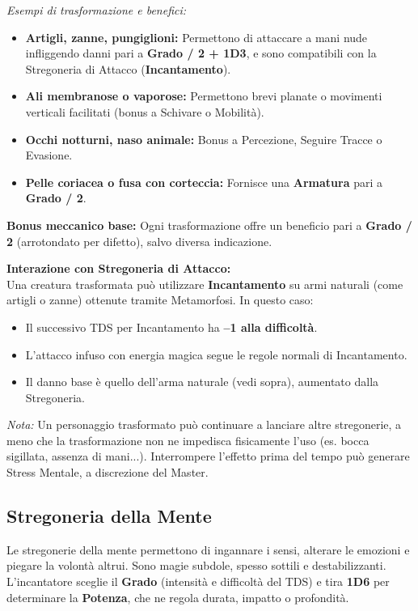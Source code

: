 \documentclass[./magie.tex]{subfiles}
\begin{document}
\textit{Esempi di trasformazione e benefici:}
\begin{itemize}
\item \textbf{Artigli, zanne, pungiglioni:} Permettono di attaccare a mani nude infliggendo danni pari a \textbf{Grado / 2 + 1D3}, e sono compatibili con la Stregoneria di Attacco (\textbf{Incantamento}).
\item \textbf{Ali membranose o vaporose:} Permettono brevi planate o movimenti verticali facilitati (bonus a Schivare o Mobilità).
\item \textbf{Occhi notturni, naso animale:} Bonus a Percezione, Seguire Tracce o Evasione.
\item \textbf{Pelle coriacea o fusa con corteccia:} Fornisce una \textbf{Armatura} pari a \textbf{Grado / 2}.
\end{itemize}

\textbf{Bonus meccanico base:} Ogni trasformazione offre un beneficio pari a \textbf{Grado / 2} (arrotondato per difetto), salvo diversa indicazione.

\vspace{0.5cm}
\textbf{Interazione con Stregoneria di Attacco:} \\
Una creatura trasformata può utilizzare \textbf{Incantamento} su armi naturali (come artigli o zanne) ottenute tramite Metamorfosi. In questo caso:
\begin{itemize}
\item Il successivo TDS per Incantamento ha \textbf{–1 alla difficoltà}.
\item L’attacco infuso con energia magica segue le regole normali di Incantamento.
\item Il danno base è quello dell’arma naturale (vedi sopra), aumentato dalla Stregoneria.
\end{itemize}

\textit{Nota:} Un personaggio trasformato può continuare a lanciare altre stregonerie, a meno che la trasformazione non ne impedisca fisicamente l’uso (es. bocca sigillata, assenza di mani...). Interrompere l’effetto prima del tempo può generare Stress Mentale, a discrezione del Master.


\clearpage
\vspace{0.2cm}
\subsection{Stregoneria della Mente}

Le stregonerie della mente permettono di ingannare i sensi, alterare le emozioni e piegare la volontà altrui. Sono magie subdole, spesso sottili e destabilizzanti. L’incantatore sceglie il \textbf{Grado} (intensità e difficoltà del TDS) e tira \textbf{1D6} per determinare la \textbf{Potenza}, che ne regola durata, impatto o profondità.
\end{document}

